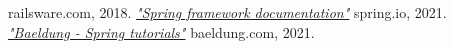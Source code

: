 \documentclass[twoside]{ctuthesis}
\begin{document}
\begin{thebibliography}{99}
        railsware.com, 2018.
        \href{https://docs.spring.io/spring-framework/docs/current/reference/html/}{\emph{"Spring framework documentation"}}
        spring.io, 2021.
        \href{https://www.baeldung.com/}{\emph{"Baeldung - Spring tutorials"}}
        baeldung.com, 2021.
    \end{thebibliography}
\end{document}
